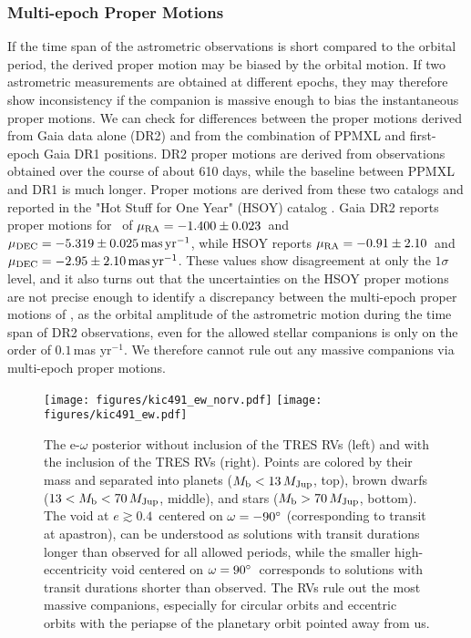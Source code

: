 \documentclass[twocolumn]{aastex63}
\begin{document}
\subsubsection{Multi-epoch Proper Motions}

If the time span of the astrometric observations is short compared to the orbital period, the derived proper motion may be biased by the orbital motion. If two astrometric measurements are obtained at different epochs, they may therefore show inconsistency if the companion is massive enough to bias the instantaneous proper motions. We can check for differences between the proper motions derived from Gaia data alone (DR2) and  from the combination of PPMXL \citep{roeser:2010} and first-epoch Gaia DR1 positions. DR2 proper motions are derived from observations obtained over the course of about 610 days, while the baseline between PPMXL and DR1 is much longer. Proper motions are derived from these two catalogs and reported in the "Hot Stuff for One Year" (HSOY) catalog \citep{altmann:2017}. Gaia DR2 reports proper motions for \thisstar\ of $\mu_{\rm RA} = -1.400 \pm 0.023$\ and $\mu_{\rm DEC} = -5.319 \pm 0.025\,{\rm mas\,yr}^{-1}$, while HSOY reports $\mu_{\rm RA} = -0.91 \pm 2.10$\ and $\mu_{\rm DEC} = -2.95 \pm 2.10\,{\rm mas\,yr}^{-1}$. These values show disagreement at only the $1\sigma$ level, and it also turns out that the uncertainties on the HSOY proper motions are not precise enough to identify a discrepancy between the multi-epoch proper motions of \thisstar, as the orbital amplitude of the astrometric motion during the time span of DR2 observations, even for the allowed stellar companions is only on the order of $0.1$\,mas yr$^{-1}$. We therefore cannot rule out any massive companions via multi-epoch proper motions.

\begin{figure*}[!t]
    \centering
    \hfill
    \texttt{[image: figures/kic491\_ew\_norv.pdf]}
    \hfill
    \texttt{[image: figures/kic491\_ew.pdf]}
    \hfill
    \caption{The e-$\omega$ posterior without inclusion of the TRES RVs (left) and with the inclusion of the TRES RVs (right). Points are colored by their mass and separated into planets ($\mb<13\,\mjup$, top), brown dwarfs ($13 < \mb < 70\,\mjup$, middle), and stars ($\mb > 70\,\mjup$, bottom). The void at $e \gtrsim 0.4$\ centered on $\omega=-90^\circ$ (corresponding to transit at apastron), can be understood as solutions with transit durations longer than observed for all allowed periods, while the smaller high-eccentricity void centered on $\omega=90^\circ$\ corresponds to solutions with transit durations shorter than observed. The RVs rule out the most massive companions, especially for circular orbits and eccentric orbits with the periapse of the planetary orbit pointed away from us.}
    \label{fig:ew}
\end{figure*}
\end{document}
